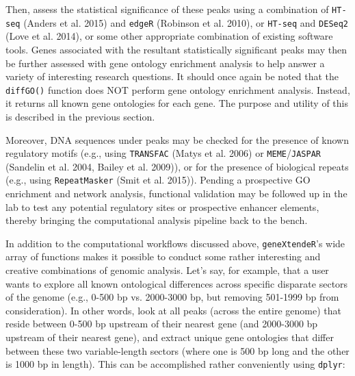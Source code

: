 \documentclass[12pt]{article}
\begin{document}
{Then, assess the statistical significance of these peaks using a combination of \texttt{HT-seq} (Anders et al. 2015) and \texttt{edgeR} (Robinson et al. 2010), or \texttt{HT-seq} and \texttt{DESeq2} (Love et al. 2014), or some other appropriate combination of existing software tools.  Genes associated with the resultant statistically significant peaks may then be further assessed with gene ontology enrichment analysis to help answer a variety of interesting research questions.  It should once again be noted that the \texttt{diffGO()} function does NOT perform gene ontology enrichment analysis.  Instead, it returns all known gene ontologies for each gene.  The purpose and utility of this is described in the previous section.

Moreover, DNA sequences under peaks may be checked for the presence of known regulatory motifs (e.g., using \texttt{TRANSFAC} (Matys et al. 2006) or \texttt{MEME}/\texttt{JASPAR} (Sandelin et al. 2004, Bailey et al. 2009)), or for the presence of biological repeats (e.g., using \texttt{RepeatMasker} (Smit et al. 2015)). Pending a prospective GO enrichment and network analysis, functional validation may be followed up in the lab to test any potential regulatory sites or prospective enhancer elements, thereby bringing the computational analysis pipeline back to the bench.

In addition to the computational workflows discussed above, \texttt{geneXtendeR}'s wide array of functions makes it possible to conduct some rather interesting and creative combinations of genomic analysis.  Let's say, for example, that a user wants to explore all known ontological differences across specific disparate sectors of the genome (e.g., 0-500 bp vs. 2000-3000 bp, but removing 501-1999 bp from consideration).  In other words, look at all peaks (across the entire genome) that reside between 0-500 bp upstream of their nearest gene (and 2000-3000 bp upstream of their nearest gene), and extract unique gene ontologies that differ between these two variable-length sectors (where one is 500 bp long and the other is 1000 bp in length).  This can be accomplished rather conveniently using \texttt{dplyr}:

}
\end{document}

